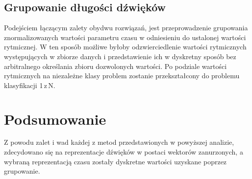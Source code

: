 {{        \subsection{Grupowanie długości dźwięków}
        {
            Podejściem łączącym zalety obydwu rozwiązań, jest przeprowadzenie grupowania znormalizowanych wartości parametru czasu w
            odniesieniu do ustalonej wartości rytmicznej. W\,\,ten sposób możliwe byłoby odzwierciedlenie wartości rytmicznych
            występujących w\,\,zbiorze danych i\,\,przedstawienie ich w\,\,dyskretny sposób bez arbitralnego określania zbioru dozwolonych
            wartości. 
            Po podziale wartości rytmicznych na niezależne klasy problem zostanie przekształcony do problemu klasyfikacji 1\,z\,N. 
        }
    }

    \section{Podsumowanie}
    {
        Z\,\,powodu zalet i\,\,wad każdej z\,\,metod przedstawionych w\,\,powyższej analizie, zdecydowano się na reprezentacje dźwięków w\,\,postaci
        wektorów zanurzonych, a\,\,wybraną reprezentacją czasu zostały dyskretne wartości uzyskane poprzez grupowanie.
    }
}